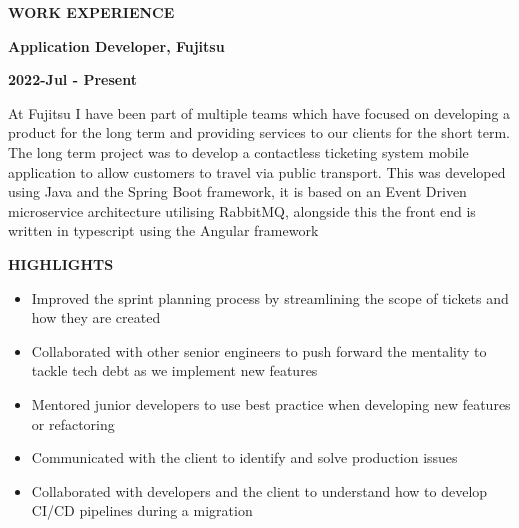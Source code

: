 \documentclass[10pt, a4paper]{article}
\begin{document}
    \vspace*{0.5in}
    {\large {} \enspace \textbf{WORK EXPERIENCE}} \par

    \vspace*{0.1in}
    {\textbf{Application Developer, Fujitsu}} \par
    {\textbf{2022-Jul - Present}} \par
    At Fujitsu I have been part of multiple teams which have focused on developing a product for the long term and providing services to our clients for the short term. The long term project was to develop a contactless ticketing system mobile application to allow customers to travel via public transport. This was developed using Java and the Spring Boot framework, it is based on an Event Driven microservice architecture utilising RabbitMQ, alongside this the front end is written in typescript using the Angular framework \par
    {\textbf{HIGHLIGHTS}} \par
    \begin{itemize}[label={\large\textbullet}]
      \item Improved the sprint planning process by streamlining the scope of tickets and how they are created
      \item Collaborated with other senior engineers to push forward the mentality to tackle tech debt as we implement new features
      \item Mentored junior developers to use best practice when developing new features or refactoring
      \item Communicated with the client to identify and solve production issues
      \item Collaborated with developers and the client to understand how to develop CI/CD pipelines during a migration
    \end{itemize}
\end{document}

